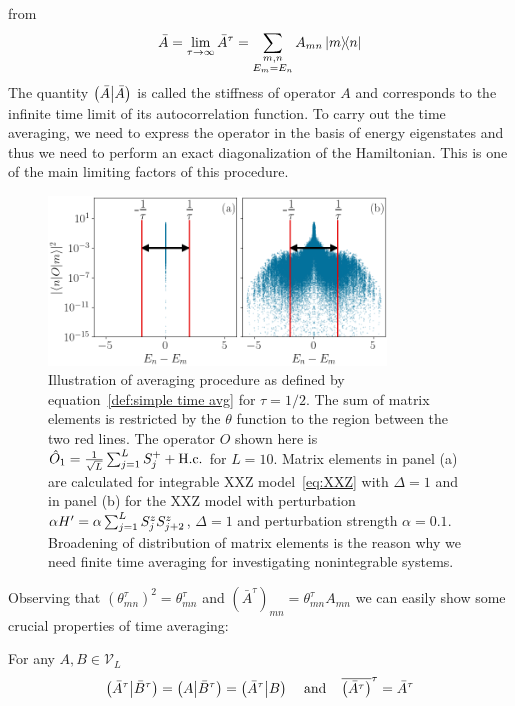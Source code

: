 from~\textcite{Mierzejewski2015a}
\begin{equation}
  \bar{A} = \lim_{\tau \to \infty} \bar{A}^{\tau} = \sum_{ \substack{m,n\\E_m=E_n} } A_{mn} \ketbra{m}{n}
  \label{eq:inf time avg}
\end{equation}
The quantity \(\left(\bar{A} \middle| \bar{A}\right)\) is called the stiffness of operator \(A\) and corresponds to the infinite time limit
of its autocorrelation function. To carry out the time averaging, we need to express the operator
in the basis of energy eigenstates and thus we need to perform an exact diagonalization of the Hamiltonian.
This is one of the main limiting factors of this procedure.
\begin{figure}[htbp]
  \centering
  \includegraphics[width=0.8\textwidth]{Figures/cutoff_small.png}
  \caption{Illustration of averaging procedure as defined by equation~\eqref{def:simple time avg}
  for \(\tau = 1/2\). The sum
  of matrix elements is restricted by the \(\theta{}\) function to the region between the two red lines. 
  The operator \(O\) shown here is \( \hat{O}_1 = \frac{1}{\sqrt{L}} \sum_{j=1}^{L} S^{+}_{j} + \textrm{H.c.}\) for \(L = 10\).
  Matrix elements in panel (a) are calculated for integrable XXZ model~\eqref{eq:XXZ} with \(\Delta = 1\) and in
  panel (b) for the XXZ model with perturbation \(\alpha H' = \alpha \sum_{j=1}^{L} S^{z}_j S^{z}_{j+2}\),
  \(\Delta = 1\) and perturbation strength \(\alpha = 0.1\). Broadening of distribution of matrix
  elements is the reason why we need finite time averaging for investigating nonintegrable systems.}
  \label{fig:cutoff}
\end{figure}
Observing that \({\left(\theta_{mn}^{\tau}\right)}^2 = \theta_{mn}^{\tau}\) and \({\left(\bar{A}^{\tau}\right)}_{mn} =
\theta_{mn}^{\tau} A_{mn}\) we can easily show some crucial properties of time averaging:
\begin{proposition}
  For any \(A,B \in \mathcal{V}_L\)
  \begin{equation*}
    \left(\bar{A}^{\tau} \middle| \bar{B}^{\tau}\right) = \left(A \middle| \bar{B}^{\tau}\right) = \left(\bar{A}^{\tau} \middle| B\right)\;\;\;\;
    \textrm{and}\;\;\;\;
    \overline{\left(\bar{A}^{\tau}\right)}^{\tau} = \bar{A}^{\tau}
  \end{equation*}
  \label{prop:projection}
\end{proposition}
